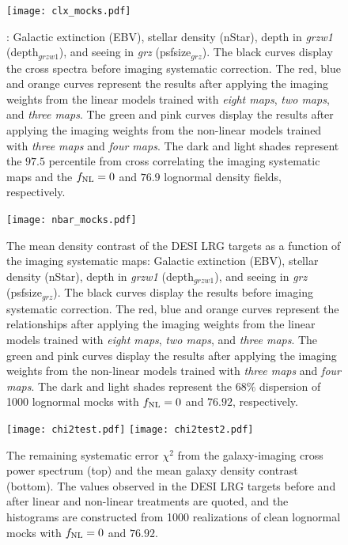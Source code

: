 \begin{figure}
\centering
\texttt{[image: clx\_mocks.pdf]}
\caption{: Galactic extinction (EBV), stellar density (nStar), depth in \textit{grzw1} (depth$_{grzw1}$), and seeing in \textit{grz} (psfsize$_{grz}$). The black curves display the cross spectra before imaging systematic correction. The red, blue and orange curves represent the results after applying the imaging weights from the linear models trained with \textit{eight maps}, \textit{two maps}, and \textit{three maps}. The green and pink curves display the results after applying the imaging weights from the non-linear models trained with \textit{three maps} and \textit{four maps}. The dark and light shades represent the $97.5$ percentile from cross correlating the imaging systematic maps and the $f_{\rm NL}=0$ and $76.9$ lognormal density fields, respectively.}\label{fig:clxmock}
\end{figure}

\begin{figure}
\centering
\texttt{[image: nbar\_mocks.pdf]}
\caption{The mean density contrast of the DESI LRG targets as a function of the imaging systematic maps: Galactic extinction (EBV), stellar density (nStar), depth in \textit{grzw1} (depth$_{grzw1}$), and seeing in \textit{grz} (psfsize$_{grz}$). The black curves display the results before imaging systematic correction. The red, blue and orange curves represent the relationships after applying the imaging weights from the linear models trained with \textit{eight maps}, \textit{two maps}, and \textit{three maps}. The green and pink curves display the results after applying the imaging weights from the non-linear models trained with \textit{three maps} and \textit{four maps}. The dark and light shades represent the $68\%$ dispersion of 1000 lognormal mocks with $f_{\rm NL}=0$ and $76.92$, respectively.}\label{fig:nbarmock}
\end{figure}


\begin{figure}
\raggedleft
\texttt{[image: chi2test.pdf]}
\texttt{[image: chi2test2.pdf]}
\caption{The remaining systematic error $\chi^{2}$ from the galaxy-imaging cross power spectrum (top) and the mean galaxy density contrast (bottom). The values observed in the DESI LRG targets before and after linear and non-linear treatments are quoted, and the histograms are constructed from 1000 realizations of clean lognormal mocks with $f_{\rm NL}=0$ and $76.92$. }\label{fig:chi2test}
\end{figure}


